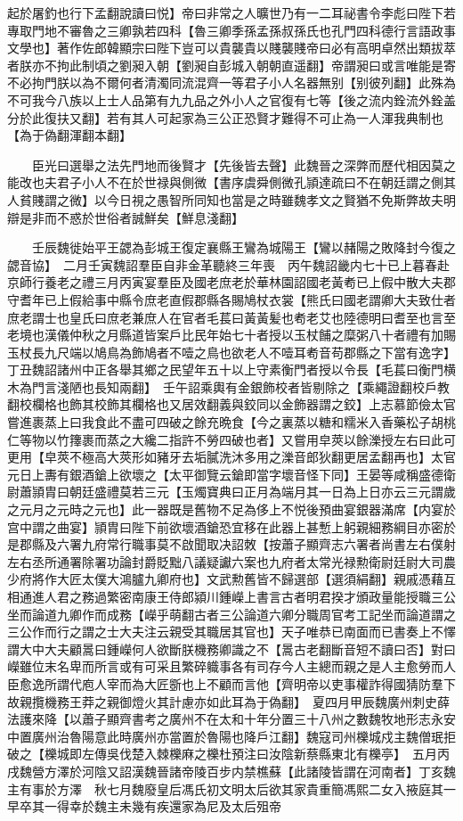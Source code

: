 起於屠釣也行下孟翻說讀曰悦】帝曰非常之人曠世乃有一二耳祕書令李彪曰陛下若專取門地不審魯之三卿孰若四科【魯三卿季孫孟孫叔孫氏也孔門四科德行言語政事文學也】著作佐郎韓顯宗曰陛下豈可以貴襲貴以賤襲賤帝曰必有高明卓然出類拔萃者朕亦不拘此制頃之劉昶入朝【劉昶自彭城入朝朝直遥翻】帝謂昶曰或言唯能是寄不必拘門朕以為不爾何者清濁同流混齊一等君子小人名器無别【别彼列翻】此殊為不可我今八族以上士人品第有九九品之外小人之官復有七等【後之流内銓流外銓盖分於此復扶又翻】若有其人可起家為三公正恐賢才難得不可止為一人渾我典制也【為于偽翻渾翻本翻】

　　臣光曰選舉之法先門地而後賢才【先後皆去聲】此魏晉之深弊而歷代相因莫之能改也夫君子小人不在於世禄與側微【書序虞舜側微孔頴達疏曰不在朝廷謂之側其人貧賤謂之微】以今日視之愚智所同知也當是之時雖魏孝文之賢猶不免斯弊故夫明辯是非而不惑於世俗者誠鮮矣【鮮息淺翻】

　　壬辰魏徙始平王勰為彭城王復定襄縣王鸞為城陽王【鸞以赭陽之敗降封今復之勰音協】　二月壬寅魏詔羣臣自非金革聽終三年喪　丙午魏詔畿内七十已上暮春赴京師行養老之禮三月丙寅宴羣臣及國老庶老於華林園詔國老黃耇已上假中散大夫郡守耆年已上假給事中縣令庶老直假郡縣各賜鳩杖衣裳【熊氏曰國老謂卿大夫致仕者庶老謂士也皇氏曰庶老兼庶人在官者毛萇曰黃黃髪也耇老艾也陸德明曰耆至也言至老境也漢儀仲秋之月縣道皆案戶比民年始七十者授以玉杖餔之糜粥八十者禮有加賜玉杖長九尺端以鳩鳥為飾鳩者不噎之鳥也欲老人不噎耳耇音苟郡縣之下當有逸字】　丁丑魏詔諸州中正各舉其鄉之民望年五十以上守素衡門者授以令長【毛萇曰衡門横木為門言淺陋也長知兩翻】　壬午詔乘輿有金銀飾校者皆剔除之【乘繩證翻校戶教翻校欄格也飾其校飾其欄格也又居效翻義與鉸同以金飾器謂之鉸】上志慕節儉太官嘗進裹蒸上曰我食此不盡可四破之餘充晩食【今之裏蒸以糖和糯米入香藥松子胡桃仁等物以竹籜裹而蒸之大纔二指許不勞四破也者】又嘗用皁莢以餘濼授左右曰此可更用【皁莢不極高大莢形如豬牙去垢膩洗沐多用之濼音郎狄翻更居孟翻再也】太官元日上夀有銀酒鎗上欲壞之【太平御覽云鎗即當字壞音怪下同】王晏等咸稱盛德衛尉蕭頴胄曰朝廷盛禮莫若三元【玉燭寶典曰正月為端月其一日為上日亦云三元謂歲之元月之元時之元也】此一器既是舊物不足為侈上不悦後預曲宴銀器滿席【内宴於宫中謂之曲宴】頴胄曰陛下前欲壞酒鎗恐宜移在此器上甚慙上躬親細務綱目亦密於是郡縣及六署九府常行職事莫不啟聞取决詔敇【按蕭子顯齊志六署者尚書左右僕射左右丞所通署除署功論封爵貶黜八議疑讞六案也九府者太常光禄勲衛尉廷尉大司農少府將作大匠太僕大鴻臚九卿府也】文武勲舊皆不歸選部【選須絹翻】親戚憑藉互相通進人君之務過繁密南康王侍郎潁川鍾嶸上書言古者明君揆才頒政量能授職三公坐而論道九卿作而成務【嶸乎萌翻古者三公論道六卿分職周官考工記坐而論道謂之三公作而行之謂之士大夫注云親受其職居其官也】天子唯恭已南面而已書奏上不懌謂大中大夫顧暠曰鍾嶸何人欲斷朕機務卿識之不【暠古老翻斷音短不讀曰否】對曰嶸雖位末名卑而所言或有可采且繁碎軄事各有司存今人主總而親之是人主愈勞而人臣愈逸所謂代庖人宰而為大匠斵也上不顧而言他【齊明帝以吏事權詐得國猜防羣下故親攬機務王莽之親御燈火其計慮亦如此耳為于偽翻】　夏四月甲辰魏廣州刺史薛法護來降【以蕭子顯齊書考之廣州不在太和十年分置三十八州之數魏牧地形志永安中置廣州治魯陽意此時廣州亦當置於魯陽也降戶江翻】魏寇司州櫟城戍主魏僧珉拒破之【櫟城即左傳吳伐楚入棘櫟麻之櫟杜預注曰汝陰新蔡縣東北有櫟亭】　五月丙戌魏營方澤於河陰又詔漢魏晉諸帝陵百步内禁樵蘇【此諸陵皆謂在河南者】丁亥魏主有事於方澤　秋七月魏廢皇后馮氏初文明太后欲其家貴重簡馮熙二女入掖庭其一早卒其一得幸於魏主未幾有疾還家為尼及太后殂帝